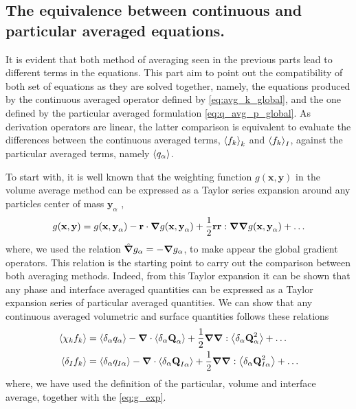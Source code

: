 
\subsection{The equivalence between continuous and particular averaged equations.}


It is evident that both method of averaging seen in the previous parts lead to different terms in the equations. 
This part aim to point out the compatibility of both set of equations as they are solved together, namely, the equations produced by the continuous averaged operator defined by \ref{eq:avg_k_global}, and the one defined by the particular averaged formulation \ref{eq:q_avg_p_global}. 
As derivation operators are linear, the latter comparison is equivalent to evaluate the differences between the continuous averaged terms, $\left<f_k\right>_k$ and $\left<f_k\right>_I$, against the particular averaged terms, namely $\left<q_\alpha\right>$.

To start with, it is well known that the weighting function $g(\textbf{x},\textbf{y})$ in the volume average method can be expressed as a Taylor series expansion around any particles center of mass $\textbf{y}_\alpha$ \citep{jackson1997locally},
\begin{equation}
    g(\textbf{x},\textbf{y})
    = g(\textbf{x},\textbf{y}_\alpha)
    - \textbf{r} \cdot \bm{\nabla} g(\textbf{x},\textbf{y}_\alpha)
    + \frac{1}{2} \textbf{r}\textbf{r} : \bm{\nabla}\bm{\nabla} g(\textbf{x},\textbf{y}_\alpha)
    + \ldots
    \label{eq:g_exp}
\end{equation} 
where, we used the relation $\hat{\bm{\nabla}} g_\alpha = - \bm{\nabla} g_\alpha$, to make appear the global gradient operators. 
This relation is the starting point to carry out the comparison between both averaging methods. 
Indeed, from this Taylor expansion it can be shown that any phase and interface averaged quantities can be expressed as a Taylor expansion series of particular averaged quantities. 
We can show that any continuous averaged volumetric and surface quantities follows these relations
\begin{align*}
    \left<\chi_kf_k\right> 
    &=  \left<\delta_\alpha q_\alpha\right>
        - \bm{\nabla} \cdot  
        \left<\delta_\alpha \textbf{Q}_\alpha\right>        
        + \frac{1}{2} \bm{\nabla}\bm{\nabla} : \left<\delta_\alpha \textbf{Q}_\alpha^2\right>
        + \ldots  \\
    \left<\delta_I f_k\right> 
    &=  \left<\delta_\alpha q_{I\alpha}\right>        
        - \bm{\nabla} \cdot \left<\delta_\alpha \textbf{Q}_{I\alpha}\right>
        + \frac{1}{2} \bm{\nabla}\bm{\nabla} : \left<\delta_\alpha \textbf{Q}_{I\alpha}^{2}\right>
        + \ldots  
\end{align*}      
where, we have used the definition of the particular, volume and interface average, together with the \ref{eq:g_exp}. 


